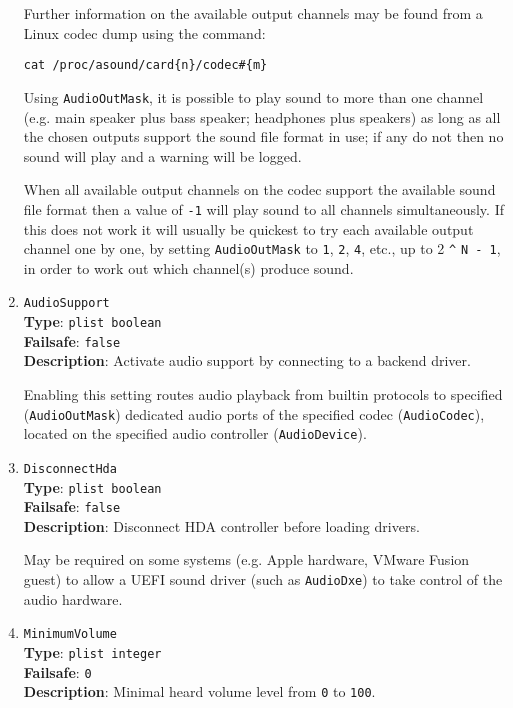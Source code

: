 \documentclass[]{article}
\begin{document}
\begin{enumerate}
  Further information on the available output channels may be found from a Linux codec dump using the command:
  
  \texttt{cat /proc/asound/card\{n\}/codec\#\{m\}}
  
  Using \texttt{AudioOutMask}, it is possible to play sound to more than one channel (e.g. main speaker plus bass speaker;
  headphones plus speakers) as long as all the chosen outputs support the sound file format in use; if any do not then no
  sound will play and a warning will be logged.

  When all available output channels on the codec support the available sound file format then a value
  of \texttt{-1} will play sound to all channels simultaneously. If this does not work it will usually be quickest
  to try each available output channel one by one, by setting \texttt{AudioOutMask} to \texttt{1}, \texttt{2},
  \texttt{4}, etc., up to 2 \texttt{\^{}} \texttt{N - 1}, in order to work out which channel(s) produce sound.

  \item
  \texttt{AudioSupport}\\
  \textbf{Type}: \texttt{plist\ boolean}\\
  \textbf{Failsafe}: \texttt{false}\\
  \textbf{Description}: Activate audio support by connecting to a backend driver.

  Enabling this setting routes audio playback from builtin protocols to specified
  (\texttt{AudioOutMask}) dedicated audio ports of the specified codec (\texttt{AudioCodec}),
  located on the specified audio controller (\texttt{AudioDevice}).

  \item
  \texttt{DisconnectHda}\\
  \textbf{Type}: \texttt{plist\ boolean}\\
  \textbf{Failsafe}: \texttt{false}\\
  \textbf{Description}: Disconnect HDA controller before loading drivers.

  May be required on some systems (e.g. Apple hardware, VMware Fusion guest) to allow
  a UEFI sound driver (such as \texttt{AudioDxe}) to take control of the audio hardware.

\item
  \texttt{MinimumVolume}\\
  \textbf{Type}: \texttt{plist\ integer}\\
  \textbf{Failsafe}: \texttt{0}\\
  \textbf{Description}: Minimal heard volume level from \texttt{0} to \texttt{100}.


\end{enumerate}
\end{document}
